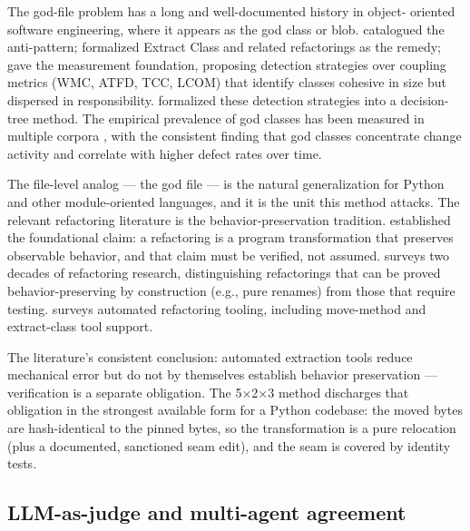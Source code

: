 \documentclass[11pt]{article}
\theoremstyle{definition}
\theoremstyle{plain}
\theoremstyle{remark}
\begin{document}
The god-file problem has a long and well-documented history in object-
oriented software engineering, where it appears as the god class or blob.
\citet{riel1996} catalogued the anti-pattern; \citet{fowler1999} formalized
Extract Class and related refactorings as the remedy; \citet{lanza2006} gave
the measurement foundation, proposing detection strategies over coupling
metrics (WMC, ATFD, TCC, LCOM) that identify classes cohesive in size but
dispersed in responsibility. \citet{marinescu2004} formalized these detection
strategies into a decision-tree method. The empirical prevalence of god
classes has been measured in multiple corpora \citep{olbrich2009}, with the
consistent finding that god classes concentrate change activity and
correlate with higher defect rates over time.

The file-level analog --- the god file --- is the natural generalization for
Python and other module-oriented languages, and it is the unit this method
attacks. The relevant refactoring literature is the behavior-preservation
tradition. \citet{opdyke1992} established the foundational claim: a
refactoring is a program transformation that preserves observable behavior,
and that claim must be verified, not assumed. \citet{mens2004} surveys two
decades of refactoring research, distinguishing refactorings that can be
proved behavior-preserving by construction (e.g., pure renames) from those
that require testing. \citet{tsantalis2011} surveys automated refactoring
tooling, including move-method and extract-class tool support.

The literature's consistent conclusion: automated extraction tools reduce
mechanical error but do not by themselves establish behavior preservation ---
verification is a separate obligation. The 5$\times$2$\times$3 method
discharges that obligation in the strongest available form for a Python
codebase: the moved bytes are hash-identical to the pinned bytes, so the
transformation is a pure relocation (plus a documented, sanctioned seam
edit), and the seam is covered by identity tests.

\subsection{LLM-as-judge and multi-agent agreement}
\end{document}
